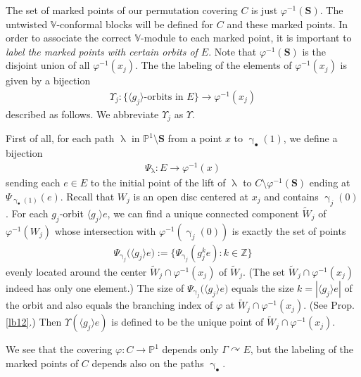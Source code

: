 \documentclass[12pt,a4paper,notitlepage]{article}
\theoremstyle{definition}
\theoremstyle{plain}
\newcommand{\wtd}{\widetilde}
\newcommand{\bk}[1]{\langle {#1}\rangle}
\newcommand{\blt}{\bullet}
\newcommand{\Vbb}{\mathbb V}
\newcommand{\Zbb}{\mathbb Z}
\newcommand{\Pbb}{\mathbb P}
\newcommand{\Sbf}{\mathbf{S}}
\numberwithin{equation}{subsection}
\begin{document}
The set of marked points of our permutation covering $C$ is just $\varphi^{-1}(\Sbf)$. The untwisted $\Vbb$-conformal blocks will be defined for $C$ and these marked points. In order to  associate the correct $\Vbb$-module to each marked point, it is important to \textit{label the marked points with certain orbits of $E$}. Note that $\varphi^{-1}(\Sbf)$ is the disjoint union of all $\varphi^{-1}(x_j)$. The the labeling of the elements of $\varphi^{-1}(x_j)$ is given by a bijection
\begin{align*}
\Upsilon_j:\{\bk{g_j}\text{-orbits in }E\}\longrightarrow \varphi^{-1}(x_j)
\end{align*}
described as follows. We abbreviate $\Upsilon_j$ as $\Upsilon$. 

First of all, for each path $\uplambda$ in $\Pbb^1\setminus\Sbf$ from a point $x$ to $\upgamma_\blt(1)$, we define a bijection
\begin{align*}
\Psi_\uplambda:E\rightarrow\varphi^{-1}(x)	
\end{align*}
sending each $e\in E$ to the initial point of the lift of $\uplambda$ to $C\setminus\varphi^{-1}(\Sbf)$ ending at $\Psi_{\upgamma_\blt(1)}(e)$. Recall that $W_j$ is an open disc centered at $x_j$ and contains $\upgamma_j(0)$. For each $g_j$-orbit $\bk{g_j}e$, we can find a unique connected component $\wtd W_j$ of $\varphi^{-1}(W_j)$ whose intersection with $\varphi^{-1}(\upgamma_j(0))$ is exactly the set of points
\begin{align*}
\Psi_{\upgamma_j}\big(\bk{g_j}e\big):=\Big\{\Psi_{\upgamma_j}(g_j^ke):k\in\Zbb\Big\}	
\end{align*}
evenly located around the center $\wtd W_j\cap\varphi^{-1}(x_j)$  of $\wtd W_j$. (The set $\wtd W_j\cap\varphi^{-1}(x_j)$ indeed has only one element.) The size of $\Psi_{\upgamma_j}\big(\bk{g_j}e\big)$ equals the size $k=|\bk{g_j}e|$ of the orbit  and also equals the branching index of $\varphi$ at $\wtd W_j\cap\varphi^{-1}(x_j)$. (See Prop. \ref{lb12}.) Then $\Upsilon(\bk{g_j}e)$  is defined to be the unique point of $\wtd W_j\cap\varphi^{-1}(x_j)$.

We see that the covering $\varphi:C\rightarrow\Pbb^1$ depends only $\Gamma\curvearrowright E$, but the labeling of the marked points of $C$ depends also on the paths $\upgamma_\blt$.
\end{document}
